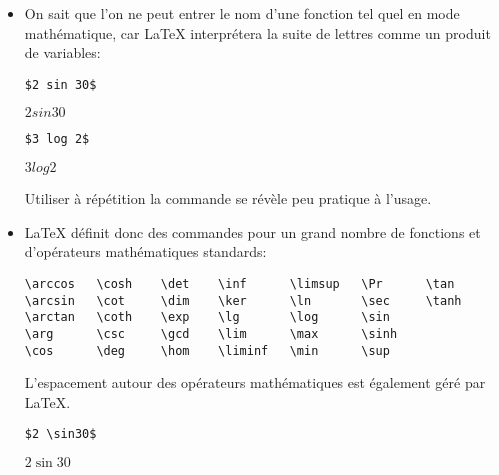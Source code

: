 \begin{itemize}
\item On sait que l'on ne peut entrer le nom d'une fonction tel quel en mode
  mathématique, car {\LaTeX} interprétera la suite de lettres comme un
  produit de variables:
  \begin{demo}
    \begin{minipage}{0.45\linewidth}
      \begin{texample}
\begin{lstlisting}
$2 sin 30$
\end{lstlisting}
        \producing
        $2 sin 30$
      \end{texample}
    \end{minipage}
    \hfill
    \begin{minipage}{0.45\linewidth}
      \begin{texample}
\begin{lstlisting}
$3 log 2$
\end{lstlisting}
        \producing
        $3 log 2$
      \end{texample}
    \end{minipage}
  \end{demo}
  Utiliser à répétition la commande  se révèle peu
  pratique à l'usage.
\item {\LaTeX} définit donc des commandes pour un grand nombre de
  fonctions et d'opérateurs mathématiques standards:
\begin{lstlisting}
\arccos   \cosh    \det    \inf      \limsup   \Pr      \tan
\arcsin   \cot     \dim    \ker      \ln       \sec     \tanh
\arctan   \coth    \exp    \lg       \log      \sin
\arg      \csc     \gcd    \lim      \max      \sinh
\cos      \deg     \hom    \liminf   \min      \sup
\end{lstlisting}
  L'espacement autour des opérateurs mathématiques est également géré
  par {\LaTeX}.
  \begin{demo}
    \begin{minipage}{0.45\linewidth}
      \begin{texample}
\begin{lstlisting}
$2 \sin30$
\end{lstlisting}
        \producing
        $2 \sin30$
      \end{texample}
    \end{minipage}
    \hfill
    \begin{minipage}{0.45\linewidth}
      \begin{texample}
\begin{lstlisting}

\end{lstlisting}
\end{texample}
\end{minipage}
\end{demo}
\end{itemize}
